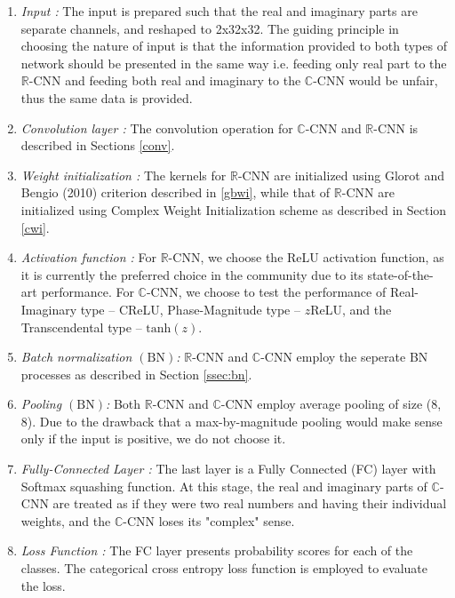  


\begin{enumerate}
	\item \textit{Input :} The input is prepared such that the real and imaginary parts are separate channels, and reshaped to 2x32x32. The guiding principle in choosing the nature of input is that the information provided to both types of network should be presented in the same way i.e. feeding only real part to the $\mathbb{R}$-CNN and feeding both real and imaginary to the $\mathbb{C}$-CNN would be unfair, thus the same data is provided. 
	\item \textit{Convolution layer :} The convolution operation for $\mathbb{C}$-CNN and $\mathbb{R}$-CNN is described in Sections \ref{conv}.
	\item \textit{Weight initialization :} The kernels for $\mathbb{R}$-CNN are initialized using Glorot and Bengio (2010) criterion \cite{glorot2010understanding} described in \ref{gbwi}, while that of $\mathbb{R}$-CNN are initialized using Complex Weight Initialization scheme \cite{trabelsi2018deep} as described in Section \ref{cwi}.
	
	\item \textit{Activation function :} For $\mathbb{R}$-CNN, we choose the ReLU activation function, as it is currently the preferred choice in the community due to its state-of-the-art performance. For $\mathbb{C}$-CNN, we choose to test the performance of Real-Imaginary type -- $\mathrm{C}$ReLU, Phase-Magnitude type --  $z$ReLU, and the Transcendental type -- $\mathrm{tanh}(z)$.
	
	\item \textit{Batch normalization $(\mathrm{BN})$:} $\mathbb{R}$-CNN and $\mathbb{C}$-CNN employ the seperate BN processes as described in Section \ref{ssec:bn}.
	
	\item \textit{Pooling $(\mathrm{BN})$:} Both $\mathbb{R}$-CNN and $\mathbb{C}$-CNN employ average pooling of size (8,  8). Due to the drawback that a max-by-magnitude pooling would make sense only if the input is positive, we do not choose it. 
	
	\item \textit{Fully-Connected Layer :}  The last layer is a Fully Connected (FC) layer with Softmax squashing function. At this stage, the real and imaginary parts of $\mathbb{C}$-CNN are treated as if they were two real numbers and having their individual weights, and the $\mathbb{C}$-CNN loses its "complex" sense.
	
	\item \textit{Loss Function :} The FC layer presents probability scores for each of the classes. The categorical cross entropy loss function is employed to evaluate the loss.
\end{enumerate}


